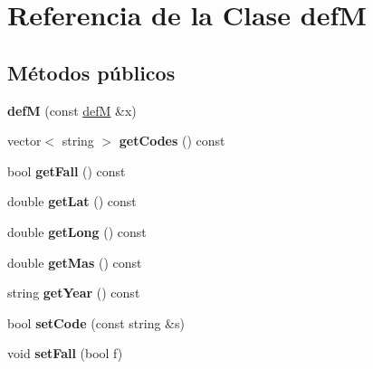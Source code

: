 \hypertarget{classdefM}{\section{Referencia de la Clase def\-M}
\label{classdefM}
}
\subsection*{Métodos públicos}
\begin{DoxyCompactItemize}
\item 
\hypertarget{classdefM_a8256dc221b6f796e1bb6520063c801e6}{{\bfseries def\-M} (const \hyperlink{classdefM}{def\-M} \&x)}\label{classdefM_a8256dc221b6f796e1bb6520063c801e6}

\item 
\hypertarget{classdefM_aa536f6f2b8b392ff2aeed210c0cf6a36}{vector$<$ string $>$ {\bfseries get\-Codes} () const }\label{classdefM_aa536f6f2b8b392ff2aeed210c0cf6a36}

\item 
\hypertarget{classdefM_a2f7f21c435fe01c695d0ddcd458491e8}{bool {\bfseries get\-Fall} () const }\label{classdefM_a2f7f21c435fe01c695d0ddcd458491e8}

\item 
\hypertarget{classdefM_a48aebee8dd70ab212ccb6de355595d70}{double {\bfseries get\-Lat} () const }\label{classdefM_a48aebee8dd70ab212ccb6de355595d70}

\item 
\hypertarget{classdefM_a39dc5b83415ab376508c954ed6dcf49d}{double {\bfseries get\-Long} () const }\label{classdefM_a39dc5b83415ab376508c954ed6dcf49d}

\item 
\hypertarget{classdefM_a52f375205e4ad27d27cb2ad61b803061}{double {\bfseries get\-Mas} () const }\label{classdefM_a52f375205e4ad27d27cb2ad61b803061}

\item 
\hypertarget{classdefM_a3d393300eae3d7a3d11876f51bed6b1e}{string {\bfseries get\-Year} () const }\label{classdefM_a3d393300eae3d7a3d11876f51bed6b1e}

\item 
\hypertarget{classdefM_acfda55375efd2a0e41245d20eaa0ec12}{bool {\bfseries set\-Code} (const string \&s)}\label{classdefM_acfda55375efd2a0e41245d20eaa0ec12}

\item 
\hypertarget{classdefM_aac6d0ed22884bcf80232e0762b1e5a76}{void {\bfseries set\-Fall} (bool f)}\label{classdefM_aac6d0ed22884bcf80232e0762b1e5a76}


\end{DoxyCompactItemize}
